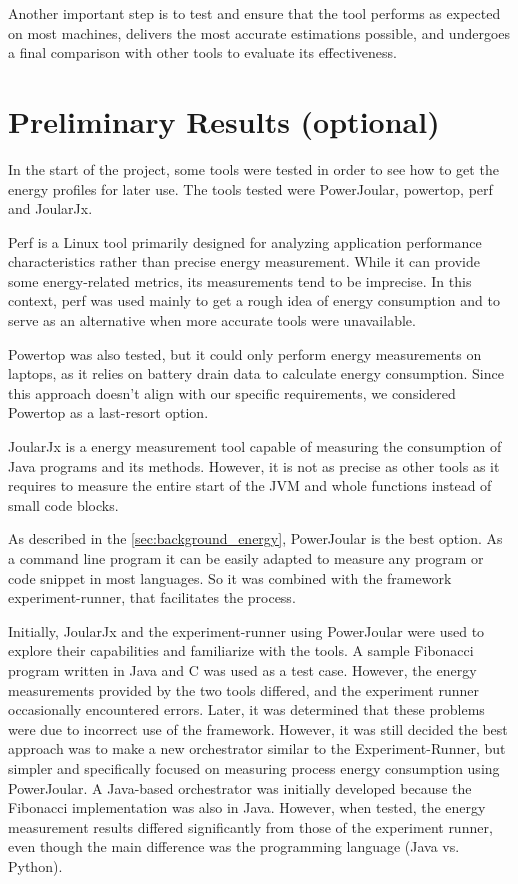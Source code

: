 \documentclass[sigplan]{acmart}
\begin{document}
Another important step is to test and ensure that the tool performs as expected on most machines, delivers the most accurate estimations possible, and undergoes a final comparison with other tools to evaluate its effectiveness.

\section{Preliminary Results (optional)} \label{sec:preliminaryresults}

In the start of the project, some tools were tested in order to see how to get the energy profiles for later use. The tools tested were PowerJoular, powertop, perf and JoularJx.

Perf is a Linux tool primarily designed for analyzing application performance characteristics rather than precise energy measurement. While it can provide some energy-related metrics, its measurements tend to be imprecise. In this context, perf was used mainly to get a rough idea of energy consumption and to serve as an alternative when more accurate tools were unavailable.

Powertop was also tested, but it could only perform energy measurements on laptops, as it relies on battery drain data to calculate energy consumption. Since this approach doesn't align with our specific requirements, we considered Powertop as a last-resort option.

JoularJx is a energy measurement tool capable of measuring the consumption of Java programs and its methods. However, it is not as precise as other tools as it requires to measure the entire start of the JVM and whole functions instead of small code blocks.

As described in the \ref{sec:background_energy}, PowerJoular is the best option. As a command line program it can be easily adapted to measure any program or code snippet in most languages. So it was combined with the framework experiment-runner, that facilitates the process.


Initially, JoularJx and the experiment-runner using PowerJoular were used to explore their capabilities and familiarize with the tools. A sample Fibonacci program written in Java and C was used as a test case. However, the energy measurements provided by the two tools differed, and the experiment runner occasionally encountered errors. Later, it was determined that these problems were due to incorrect use of the framework. However, it was still decided the best approach was to make a new orchestrator similar to the Experiment-Runner, but simpler and specifically focused on measuring process energy consumption using PowerJoular. A Java-based orchestrator was initially developed because the Fibonacci implementation was also in Java. However, when tested, the energy measurement results differed significantly from those of the experiment runner, even though the main difference was the programming language (Java vs. Python).
\end{document}
